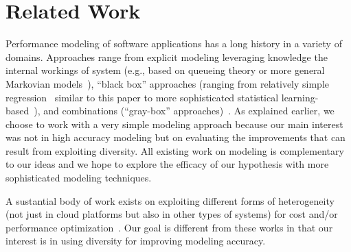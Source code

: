 \section{Related Work}
\label{sec:related}
\vspace{10pt}

\begin{comment}
\begin{itemize}
\item Performance modeling of s/w applications has a long history in a variety of domains. We only discuss some recent salient and representative efforts with close connections to our work.
\item Alternative modeling approaches: explicit modeling based on queuing theory, other Markovian models; black box modeling based on regression, time-series, prediction, learning, control theory; gray box such as Wisconsin, shivnath babu?. All of these modeling techniques are suitable candidates to benefit from our hypothesis as all of them require some form of offline/onling profiling whose quality might be improved via exploting diversity. 
\item Highly complementary to our work is a recent paper that exploits non-stationarity of transaction types. Their work can be readily combined with ours. 
\item Delta modeling from CMU has some similarities. 
\item Work on exploiting heterogeneity for cost or performance efficacy, e.g., ~\cite{Zhang15}
\end{itemize}
\end{comment}

Performance modeling of software applications has a long history in a variety of domains. Approaches range from explicit modeling leveraging knowledge the internal workings of system (e.g., based on queueing theory or more general Markovian models~\cite{DBLP:journals/internet/Menasce04,sigmetrics05,SchroederWH06,DBLP:conf/cmg/MenasceB12}), ``black box'' approaches (ranging from relatively simple regression~\cite{Stewart07} similar to this paper to more sophisticated statistical learning-based~\cite{Mesnier:2006:RFM:1138085.1138092,MiCCS10,ZhangCL14,DBLP:journals/debu/HerodotouB13}), and combinations (``gray-box'' approaches)~\cite{Arpaci-Dusseau:2001:ICG:502034.502040,Thereska:2008:IRP:1375457.1375486}. As explained earlier, we choose to work with a very simple modeling approach because our main interest was not in high accuracy modeling but on evaluating the improvements that can result from exploiting diversity. All existing work on modeling is complementary to our ideas and we hope to explore the efficacy of our hypothesis with more sophisticated modeling techniques.

A sustantial body of work exists on exploiting different forms of heterogeneity (not just in cloud platforms but also in other types of systems) for cost and/or performance optimization~\cite{DBLP:conf/cloud/ReissTGKK12,Zhang15,Farley:2012:MYM:2391229.2391249,DBLP:conf/hotcloud/LeeK11}. Our goal is different from these works in that our interest is in using diversity for improving modeling accuracy. 